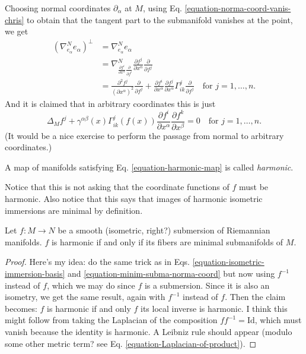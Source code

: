 Choosing normal coordinates $\partial_\alpha$
at $M$, using Eq.
\ref{equation-norma-coord-vanis-chris} to
obtain
that the tangent part to the submanifold
vanishes at the point, we get
\begin{equation}
\label{equation-minim-subma-norma-coord}
\begin{aligned}
(\nabla^N_{e_\alpha}e_\alpha)^\perp&=
\nabla^N_{e_\alpha}e_\alpha\\
&=\nabla^N
_{\frac{\partial f^i}{\partial
x^\alpha}\frac{\partial }{\partial f^i}}
\frac{\partial f^j}{\partial
x^\alpha}\frac{\partial }{\partial f^j}\\
&=\frac{\partial^2 f^j}{(\partial
x^\alpha)^2}\frac{\partial }{\partial f^j}
+\frac{\partial f^i}{\partial
x^\alpha}\frac{\partial f^j}{\partial
x^\alpha}
\Gamma^j_{ik}\frac{\partial }{\partial
f^j}\quad \text{for }j=1,\ldots,n.
\end{aligned}
\end{equation}
And it is claimed that in arbitrary
coordinates this is just
\begin{equation}
\label{equation-harmonic-map}
\Delta_Mf^j+\gamma^{\alpha
\beta}(x)\Gamma^j_{ik}(f(x))
\frac{\partial f^i}{\partial
x^\alpha}\frac{\partial f^k}{\partial
x^\beta}=0
\quad \text{for }j=1,\ldots,n.
\end{equation}
(It would be a nice exercise to perform the
passage from normal to arbitrary
coordinates.)
\begin{definition}
\label{definition-harmonic-map}
A map of manifolds satisfying Eq.
\ref{equation-harmonic-map} is
called {\it harmonic}.
\end{definition}
Notice that this is not asking that the
coordinate
functions of $f$ must be harmonic. Also
notice that this says that images of
harmonic isometric immersions are minimal by
definition.

\begin{lemma}
\label{lemma-fibers-of-harmonic-submersion}
Let $f:M\to N$ be a smooth (isometric,
right?) submersion of
Riemannian manifolds. $f$ is
harmonic if and only if its fibers are
minimal submanifolds of $M$.
\end{lemma}

\begin{proof}
Here's my idea: do the same trick as in Eqs.
\ref{equation-isometric-immersion-basis} and
\ref{equation-minim-subma-norma-coord} but
now using
$f^{-1}$ instead of $f$, which we may do
since $f$ is a submersion. Since it is
also an isometry, we get the same result,
again with $f^{-1}$ instead of $f$.
Then the claim becomes: $f$ is harmonic if
and only $f$ its local inverse is
harmonic. I think this might follow from
taking the Laplacian of the composition
$f f^{-1}=\text{Id}$, which must vanish
because the identity is harmonic. A
Leibniz rule should appear (modulo some other
metric term? see Eq.
\ref{equation-Laplacian-of-product}).
\end{proof}

